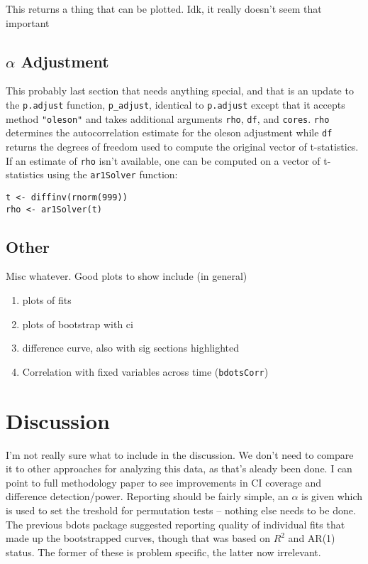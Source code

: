 \documentclass{article}
\begin{document}
This returns a thing that can be plotted. Idk, it really doesn't seem that important

\subsection{$\alpha$ Adjustment}

This probably last section that needs anything special, and that is an update to the \texttt{p.adjust} function, \texttt{p\_adjust}, identical to \texttt{p.adjust} except that it accepts method \texttt{"oleson"} and takes additional arguments \texttt{rho}, \texttt{df}, and \texttt{cores}. \texttt{rho} determines the autocorrelation estimate for the oleson adjustment while \texttt{df} returns the degrees of freedom used to compute the original vector of t-statistics. If an estimate of \texttt{rho} isn't available, one can be computed on a vector of t-statistics using the \texttt{ar1Solver} function:

\begin{center}
\texttt{t <- diffinv(rnorm(999))} \\
\texttt{rho <- ar1Solver(t)}
\end{center}


\subsection{Other}

Misc whatever. Good plots to show include (in general)

\begin{enumerate}
\item plots of fits
\item plots of bootstrap with ci
\item difference curve, also with sig sections highlighted
\item Correlation with fixed variables across time (\texttt{bdotsCorr})
\end{enumerate}

\section{Discussion}
I'm not really sure what to include in the discussion. We don't need to compare it to other approaches for analyzing this data, as that's aleady been done. I can point to full methodology paper to see improvements in CI coverage and difference detection/power. Reporting should be fairly simple, an $\alpha$ is given which is used to set the treshold for permutation tests -- nothing else needs to be done. The previous bdots package suggested reporting quality of individual fits that made up the bootstrapped curves, though that was based on $R^2$ and AR(1) status. The former of these is problem specific, the latter now irrelevant.
\end{document}
